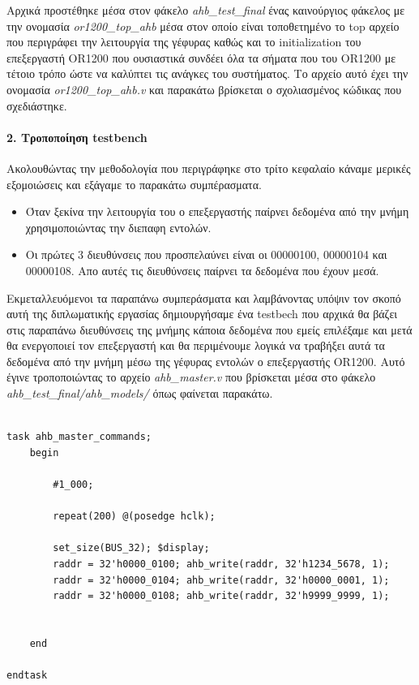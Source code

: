\documentclass[a4paper,10pt]{article}
\numberwithin{figure}{section}
\numberwithin{table}{section}
\begin{document}
Αρχικά προστέθηκε μέσα στον φάκελο \emph{ahb\_test\_final} ένας καινούργιος φάκελος με την ονομασία \emph{or1200\_top\_ahb} μέσα στον οποίο είναι τοποθετημένο το top αρχείο που περιγράφει την λειτουργία της γέφυρας καθώς και το initialization  του επεξεργαστή OR1200 που ουσιαστικά συνδέει όλα τα σήματα που του OR1200 με τέτοιο τρόπο ώστε να καλύπτει τις ανάγκες του συστήματος. Το αρχείο αυτό έχει την ονομασία \emph{or1200\_top\_ahb.v} και παρακάτω βρίσκεται ο σχολιασμένος κώδικας που σχεδιάστηκε.


\vspace{0.7cm}
 
\newpage


\paragraph{2. Τροποποίηση testbench\newline\newline}

Ακολουθώντας την μεθοδολογία που περιγράφηκε στο τρίτο κεφαλαίο κάναμε μερικές εξομοιώσεις και εξάγαμε το παρακάτω συμπέρασματα.
\begin{itemize}
 \item Όταν ξεκίνα την λειτουργία του ο επεξεργαστής παίρνει δεδομένα από την μνήμη χρησιμοποιώντας την διεπαφη εντολών.
 \item Οι πρώτες 3 διευθύνσεις που προσπελαύνει είναι οι 00000100, 00000104 και 00000108. Απο αυτές τις διευθύνσεις παίρνει τα δεδομένα που έχουν μεσά.
\end{itemize}

Εκμεταλλευόμενοι τα παραπάνω συμπεράσματα και λαμβάνοντας υπόψιν τον σκοπό αυτή της διπλωματικής εργασίας δημιουργήσαμε ένα testbech που αρχικά θα βάζει στις παραπάνω διευθύνσεις της μνήμης κάποια δεδομένα που εμείς επιλέξαμε και μετά θα ενεργοποιεί τον επεξεργαστή και θα περιμένουμε λογικά να τραβήξει αυτά τα δεδομένα από την μνήμη μέσω της γέφυρας εντολών ο επεξεργαστής OR1200.
\newline
Αυτό έγινε τροποποιώντας το αρχείο \emph{ahb\_master.v} που βρίσκεται μέσα στο φάκελο \emph{ahb\_test\_final/ahb\_models/} όπως φαίνεται παρακάτω.
\newline
\begin{lstlisting}

task ahb_master_commands;
    begin

        #1_000;
        
        repeat(200) @(posedge hclk);
        
        set_size(BUS_32); $display;
        raddr = 32'h0000_0100; ahb_write(raddr, 32'h1234_5678, 1);
        raddr = 32'h0000_0104; ahb_write(raddr, 32'h0000_0001, 1);
        raddr = 32'h0000_0108; ahb_write(raddr, 32'h9999_9999, 1);

    
    end

endtask

\end{lstlisting}
\end{document}
